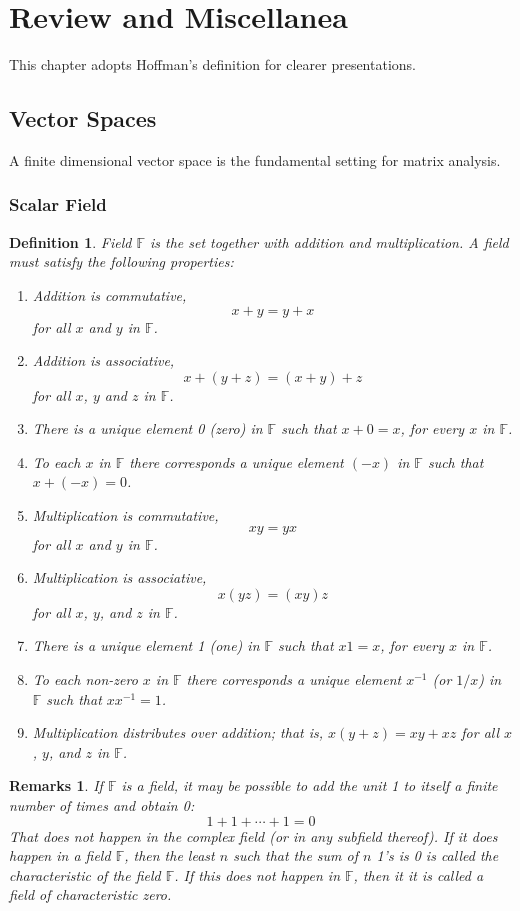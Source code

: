 \documentclass{article}
\newtheorem*{remarks}{Remarks}
\newtheorem*{definition}{Definition}
\begin{document}
    \section{Review and Miscellanea}
    This chapter adopts Hoffman's definition for clearer presentations.
    \subsection{Vector Spaces}
    A finite dimensional vector space is the fundamental setting for matrix analysis.
    \subsubsection{Scalar Field}
    \begin{definition}
        Field \(\mathbb{F}\) is the set together with addition and
        multiplication. A field must satisfy the following properties:
        \begin{enumerate}
            \item Addition is commutative, \[x+y=y+x\] for all \(x\) and \(y\) in \(\mathbb{F}\).
            \item Addition is associative, \[x+(y+z)=(x+y)+z\] for all \(x\), \(y\) and \(z\) in \(\mathbb{F}\).
            \item There is a unique element 0 (zero) in \(\mathbb{F}\) such that \(x+0=x\), for every \(x\) in \(\mathbb{F}\).
            \item To each \(x\) in \(\mathbb{F}\) there corresponds a unique element \((-x)\) in \(\mathbb{F}\) such that \(x + (-x) = 0\).
            \item Multiplication is commutative, \[xy=yx\] for all \(x\) and \(y\) in \(\mathbb{F}\).
            \item Multiplication is associative, \[x(yz)=(xy)z\] for all \(x\), \(y\), and \(z\) in \(\mathbb{F}\).
            \item There is a unique element 1 (one) in \(\mathbb{F}\) such that \(x1=x\), for every \(x\) in \(\mathbb{F}\).
            \item To each non-zero \(x\) in \(\mathbb{F}\) there corresponds a unique element \(x^{-1}\) (or \(1/x\)) in \(\mathbb{F}\) such that \(xx^{-1}=1\).
            \item Multiplication distributes over addition; that is, \(x(y+z)=xy+xz\) for all \(x\), \(y\), and \(z\) in \(\mathbb{F}\).
        \end{enumerate}
    \end{definition}
    \begin{remarks}
        If \(\mathbb{F}\) is a field, it may be possible to add the unit 1 to itself
        a finite number of times and obtain 0: \[1+1+\cdots+1=0\] That does not happen in
        the complex field (or in any subfield thereof). If it does happen in a field \(\mathbb{F}\),
        then the least \(n\) such that the sum of \(n\) 1's is 0 is called the characteristic
        of the field \(\mathbb{F}\). If this does not happen in \(\mathbb{F}\), then it it
        is called a field of characteristic zero.
    \end{remarks}
\end{document}
